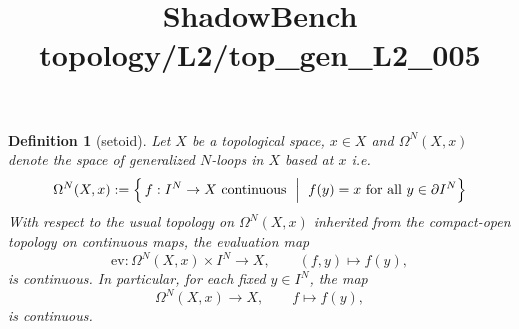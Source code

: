 \documentclass{article}
\title{ShadowBench topology/L2/top\_gen\_L2\_005}
\newtheorem{definition}{Definition}
\begin{document}
\maketitle

\begin{definition}[setoid]
Let $X$ be a topological space, $x \in X$ and $\Omega^{N}(X,x)$ denote the space of \emph{generalized $N$-loops in $X$ based at $x$} i.e.
\[
\Omega^{N}(X,x)
:=
\Bigl\{\, f : I^{N} \to X \ \text{continuous} \ \Bigm|\ 
f(y)=x \text{ for all } y \in \partial I^{N} \Bigr\}
\]
With respect to the usual topology on $ \Omega^{N}(X,x)$ inherited from the compact-open topology on continuous maps, the evaluation map
\[
\mathrm{ev} : \Omega^{N}(X,x) \times I^{N} \longrightarrow X,
\qquad
(f,y) \longmapsto f(y),
\]
is continuous.  
In particular, for each fixed $y \in I^{N}$, the map
\[
\Omega^{N}(X,x) \longrightarrow X,
\qquad
f \longmapsto f(y),
\]
is continuous.
\end{definition}
\end{document}
